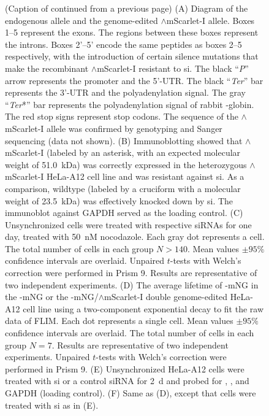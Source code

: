 \begin{figure}
    \noindent\justifying (Caption of  continued from a previous page) (A) Diagram of the endogenous  allele and the genome-edited $\wedge$mScarlet-I allele. Boxes 1--5 represent the exons. The regions between these boxes represent the introns. Boxes 2'--5' encode the same peptides as boxes 2--5 respectively, with the introduction of certain silence mutations that make the recombinant $\wedge$mScarlet-I resistant to si. The black ``\textit{P}'' arrow represents the promoter and the 5'-UTR. The black ``\textit{Ter}'' bar represents the 3'-UTR and the polyadenylation signal. The gray ``\textit{Ter}*'' bar represents the polyadenylation signal of rabbit \textbeta{}-globin. The red stop signs represent stop codons. The sequence of the $\wedge$mScarlet-I allele was confirmed by genotyping and Sanger sequencing (data not shown). (B) Immunoblotting showed that $\wedge$mScarlet-I (labeled by an asterisk, with an expected molecular weight of \SI{51.0}{kDa}) was correctly expressed in the heterozygous $\wedge$mScarlet-I HeLa-A12 cell line and was resistant against si. As a comparison, wildtype  (labeled by a cruciform with a molecular weight of \SI{23.5}{kDa}) was effectively knocked down by si. The immunoblot against GAPDH served as the loading control. (C) Unsynchronized cells were treated with respective siRNAs for one day, treated with \SI{50}{nM} nocodazole. Each gray dot represents a cell. The total number of cells in each group $N > 140$. Mean values $\pm 95\%$ confidence intervals are overlaid. Unpaired $t$-tests with Welch's correction were performed in Prism 9. Results are representative of two independent experiments. (D) The average lifetime of -mNG in the -mNG or the -mNG/$\wedge$mScarlet-I double genome-edited HeLa-A12 cell  line using a two-component exponential decay to fit the raw data of FLIM. Each dot represents a single cell. Mean values $\pm 95\%$ confidence intervals are overlaid. The total number of cells in each group $N = 7$. Results are representative of two independent experiments. Unpaired $t$-tests with Welch's correction were performed in Prism 9. (E) Unsynchronized HeLa-A12 cells were treated with si or a control siRNA for \SI{2}{d} and probed for , , and GAPDH (loading control). (F) Same as (D), except that cells were treated with si as in (E).
\end{figure}

